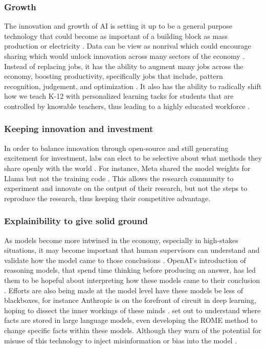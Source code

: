 \subsubsection{Growth}

The innovation and growth of AI is setting it up to be a general purpose technology that could become as important of a building block as mass production or electricity \citep{gruetzemacher_transformative_2021}. Data can be view as nonrival which could encourage sharing which would unlock innovation across many sectors of the economy \citep{jones_nonrivalry_2020}. Instead of replacing jobs, it has the ability to augment many jobs across the economy, boosting productivity, specifically jobs that include, pattern recognition, judgement, and optimization \citep{european_commission_impact_2022}. It also has the ability to radically shift how we teach K-12 with personalized learning tacks for students that are controlled by knowable teachers, thus leading to a highly educated workforce \citep{latif_agi_2024}.

\subsubsection{Keeping innovation and investment}

In order to balance innovation through open-source and still generating excitement for investment, labs can elect to be selective about what methods they share openly with the world \citep{eiras_near_2024}. For instance, Meta shared the model weights for Llama but not the training code \citep{touvron_llama_2023}. This allows the research community to experiment and innovate on the output of their research, but not the steps to reproduce the research, thus keeping their competitive advantage.

\subsubsection{Explainibility to give solid ground}

As models become more intwined in the economy, especially in high-stakes situations, it may become important that human supervisors can understand and validate how the model came to those conclusions \citep{ji_ai_2023}. OpenAI's introduction of reasoning models, that spend time thinking before producing an answer, has led them to be hopeful about interpreting how these models came to their conclusion \citep{openai_o1_2024}. Efforts are also being made at the model level have these models be less of blackboxes, for instance Anthropic is on the forefront of circuit in deep learning, hoping to dissect the inner workings of these minds \citep{nelson_elhage_mathematical_2021}. \cite{meng_locating_2023} set out to understand where facts are stored in large language models, even developing the ROME method to change specific facts within these models. Although they warn of the potential for misuse of this technology to inject misinformation or bias into the model \citep{meng_locating_2023}.

